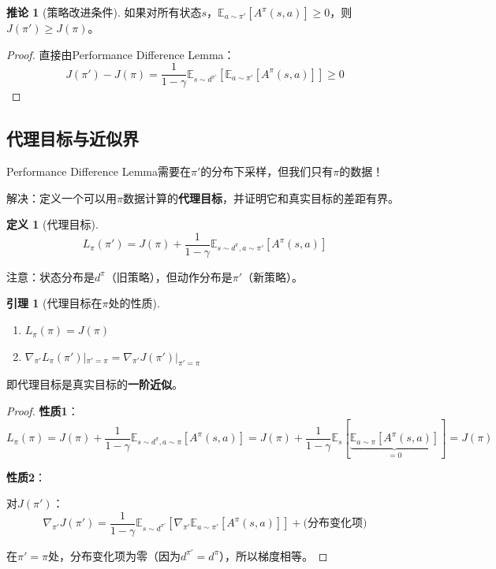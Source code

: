 \documentclass[11pt,a4paper]{article}
\theoremstyle{definition}
\newtheorem{definition}{定义}[section]
\newtheorem{lemma}{引理}[section]
\newtheorem{corollary}{推论}[section]
\begin{document}
\begin{corollary}[策略改进条件]
如果对所有状态$s$，$\mathbb{E}_{a \sim \pi'}[A^\pi(s,a)] \geq 0$，则$J(\pi') \geq J(\pi)$。
\end{corollary}

\begin{proof}
直接由Performance Difference Lemma：
\[
J(\pi') - J(\pi) = \frac{1}{1-\gamma} \mathbb{E}_{s \sim d^{\pi'}}\left[\mathbb{E}_{a \sim \pi'}[A^\pi(s,a)]\right] \geq 0
\]
\end{proof}

\subsection{代理目标与近似界}

\begin{plainwords}[问题]
Performance Difference Lemma需要在$\pi'$的分布下采样，但我们只有$\pi$的数据！

解决：定义一个可以用$\pi$数据计算的\textbf{代理目标}，并证明它和真实目标的差距有界。
\end{plainwords}

\begin{definition}[代理目标]
\[
L_\pi(\pi') = J(\pi) + \frac{1}{1-\gamma}\mathbb{E}_{s \sim d^\pi, a \sim \pi'}\left[A^\pi(s,a)\right]
\]

注意：状态分布是$d^\pi$（旧策略），但动作分布是$\pi'$（新策略）。
\end{definition}

\begin{lemma}[代理目标在$\pi$处的性质]
\begin{enumerate}
    \item $L_\pi(\pi) = J(\pi)$
    \item $\nabla_{\pi'} L_\pi(\pi')|_{\pi'=\pi} = \nabla_{\pi'} J(\pi')|_{\pi'=\pi}$
\end{enumerate}
即代理目标是真实目标的\textbf{一阶近似}。
\end{lemma}

\begin{proof}
\textbf{性质1}：
\[
L_\pi(\pi) = J(\pi) + \frac{1}{1-\gamma}\mathbb{E}_{s \sim d^\pi, a \sim \pi}[A^\pi(s,a)] = J(\pi) + \frac{1}{1-\gamma}\mathbb{E}_s[\underbrace{\mathbb{E}_{a \sim \pi}[A^\pi(s,a)]}_{=0}] = J(\pi)
\]

\textbf{性质2}：

对$J(\pi')$：
\[
\nabla_{\pi'} J(\pi') = \frac{1}{1-\gamma}\mathbb{E}_{s \sim d^{\pi'}}\left[\nabla_{\pi'}\mathbb{E}_{a \sim \pi'}[A^\pi(s,a)]\right] + \text{(分布变化项)}
\]

在$\pi' = \pi$处，分布变化项为零（因为$d^{\pi'} = d^\pi$），所以梯度相等。
\end{proof}
\end{document}
